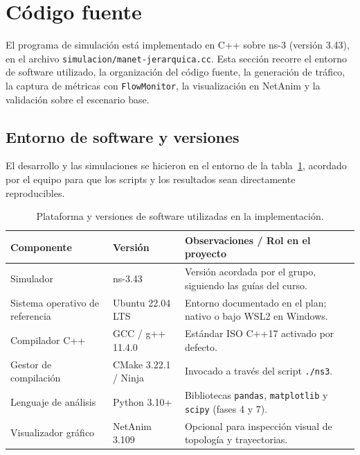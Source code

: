 \section{Código fuente}
\label{sec:codigo-fuente}

El programa de simulación está implementado en C++ sobre ns-3 (versión 3.43), en el archivo \texttt{simulacion/manet-jerarquica.cc}. Esta sección recorre el entorno de software utilizado, la organización del código fuente, la generación de tráfico, la captura de métricas con \texttt{FlowMonitor}, la visualización en NetAnim y la validación sobre el escenario base.

\subsection{Entorno de software y versiones}

El desarrollo y las simulaciones se hicieron en el entorno de la tabla~\ref{tab:versiones-software}, acordado por el equipo para que los scripts y los resultados sean directamente reproducibles.

\begin{table}[h]
\centering
\small
\begin{tabular}{p{3.2cm}p{3.2cm}p{6.2cm}}
\toprule
\textbf{Componente} & \textbf{Versión} & \textbf{Observaciones / Rol en el proyecto} \\
\midrule
Simulador & ns-3.43 & Versión acordada por el grupo, siguiendo las guías del curso. \\
Sistema operativo de referencia & Ubuntu 22.04 LTS & Entorno documentado en el plan; nativo o bajo WSL2 en Windows. \\
Compilador C++ & GCC / g++ 11.4.0 & Estándar ISO C++17 activado por defecto. \\
Gestor de compilación & CMake 3.22.1 / Ninja & Invocado a través del script \texttt{./ns3}. \\
Lenguaje de análisis & Python 3.10+ & Bibliotecas \texttt{pandas}, \texttt{matplotlib} y \texttt{scipy} (fases 4 y 7). \\
Visualizador gráfico & NetAnim 3.109 & Opcional para inspección visual de topología y trayectorias. \\
\bottomrule
\end{tabular}
\caption{Plataforma y versiones de software utilizadas en la implementación.}
\label{tab:versiones-software}
\end{table}

